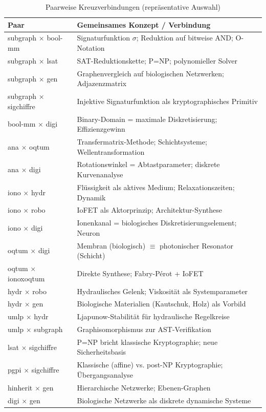 ﻿\documentclass[a4paper,12pt]{scrreprt}
\theoremstyle{definition}
\begin{document}
\begin{table}[H]
\caption{Paarweise Kreuzverbindungen (repräsentative Auswahl)}
\label{tab:cross_matrix}
\small
\begin{tabularx}{\textwidth}{l X}
\toprule
\textbf{Paar} & \textbf{Gemeinsames Konzept / Verbindung} \\
\midrule
subgraph $\times$ bool-mm
  & Signaturfunktion $\sigma$; Reduktion auf bitweise AND; O-Notation \\
subgraph $\times$ lsat
  & SAT-Reduktionskette; P=NP; polynomieller Solver \\
subgraph $\times$ gen
  & Graphenvergleich auf biologischen Netzwerken; Adjazenzmatrix \\
subgraph $\times$ sigchiffre
  & Injektive Signaturfunktion als kryptographisches Primitiv \\
bool-mm $\times$ digi
  & Binary-Domain = maximale Diskretisierung; Effizienzgewinn \\
ana $\times$ oqtum
  & Transfermatrix-Methode; Schichtsysteme; Wellentransformation \\
ana $\times$ digi
  & Rotationswinkel = Abtastparameter; diskrete Kurvenanalyse \\
iono $\times$ hydr
  & Flüssigkeit als aktives Medium; Relaxationszeiten; Dynamik \\
iono $\times$ robo
  & IoFET als Aktorprinzip; Architektur-Synthese \\
iono $\times$ digi
  & Ionenkanal = biologisches Diskretisierungselement; Neuron \\
oqtum $\times$ digi
  & Membran (biologisch) $\equiv$ photonischer Resonator (Schicht) \\
oqtum $\times$ ionoxoqtum
  & Direkte Synthese; Fabry-Pérot + IoFET \\
hydr $\times$ robo
  & Hydraulisches Gelenk; Viskosität als Systemparameter \\
hydr $\times$ gen
  & Biologische Materialien (Kautschuk, Holz) als Vorbild \\
umlp $\times$ hydr
  & Ljapunow-Stabilität für hydraulische Regelkreise \\
umlp $\times$ subgraph
  & Graphisomorphismus zur AST-Verifikation \\
lsat $\times$ sigchiffre
  & P=NP bricht klassische Kryptographie; neue Sicherheitsbasis \\
pgpi $\times$ sigchiffre
  & Klassische (affine) vs. post-NP Kryptographie; Übergangsanalyse \\
hinherit $\times$ gen
  & Hierarchische Netzwerke; Ebenen-Graphen \\
digi $\times$ gen
  & Biologische Netzwerke als diskrete dynamische Systeme \\
\bottomrule
\end{tabularx}
\end{table}
\end{document}
